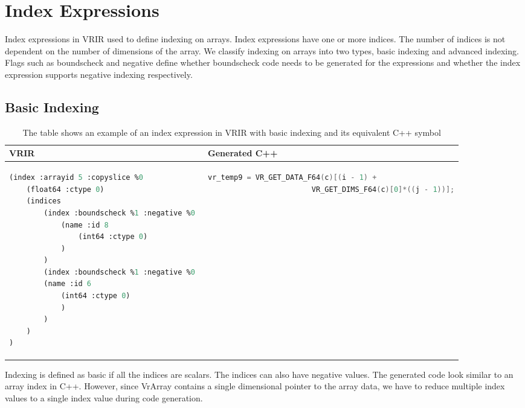 \section{Index Expressions}
Index expressions in VRIR used to define indexing on arrays. Index expressions have one or more indices. The number of indices is not dependent on the number of dimensions of the array. We classify indexing on arrays into two types, basic indexing and advanced indexing. Flags such as boundscheck and negative define whether boundscheck code needs to be generated for the expressions and whether the index expression supports negative indexing respectively.
\subsection{Basic Indexing}
\label{subsec:basicindexing}
\begin{table}[htbp]
\centering
\begin{tabular}{|l|l|}
\hline

VRIR &  Generated C++ \\
\hline
{
\begin{lstlisting}[language=lisp,frame=none, numbers=none]
(index :arrayid 5 :copyslice %0
	(float64 :ctype 0)
	(indices 
		(index :boundscheck %1 :negative %0 
			(name :id 8 
				(int64 :ctype 0)
			)
		)
		(index :boundscheck %1 :negative %0 
   		(name :id 6 
   			(int64 :ctype 0)
			)
		)
	)
)
\end{lstlisting}
}
&
{
\begin{lstlisting}[language=c,frame=none, numbers=none]
vr_temp9 = VR_GET_DATA_F64(c)[(i - 1) + 
						VR_GET_DIMS_F64(c)[0]*((j - 1))];
\end{lstlisting}
} \\
\hline
\end{tabular}
\caption[Basic array indexing example]{The table shows an example of an index expression in VRIR  with basic indexing and its equivalent C++ symbol}
\label{tab:basicIndex}
\end{table}
Indexing is defined as basic if all the indices are scalars. The indices can also have negative values. The generated code look similar to an array index in C++. However, since VrArray contains a single dimensional pointer to the array data, we have to reduce multiple index values to a single index value during code generation.
